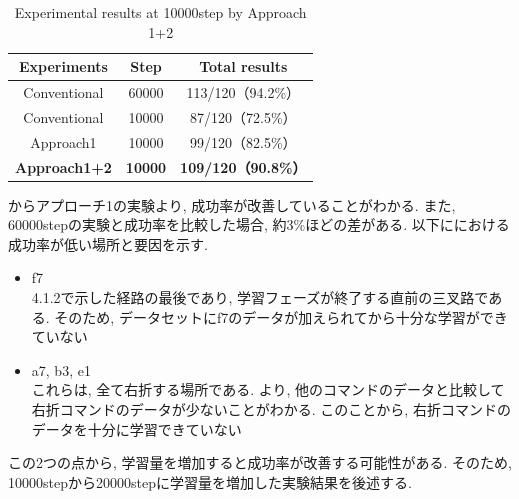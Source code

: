 \begin{itemize}

  \begin{table}[hbtp]
    \caption{Experimental results at 10000step by Approach 1+2}
    \label{table:result4}
    \centering
    \begin{tabular}{|c|c|c|}
      \hline
      Experiments & Step & Total results\\
      \hline
      Conventional & 60000 & 113/120（94.2\%）\\
      \hline
      Conventional & 10000 & 87/120（72.5\%）\\
      \hline
      Approach1 & 10000 & 99/120（82.5\%）\\
      \hline
      \textbf{Approach1+2} & \textbf{10000} & \textbf{109/120（90.8\%）}\\
      \hline
    \end{tabular}
  \end{table}


  からアプローチ1の実験より, 成功率が改善していることがわかる. また, 60000stepの実験と成功率を比較した場合, 約3\%ほどの差がある. 
  以下ににおける成功率が低い場所と要因を示す.
  \begin{itemize}
    \item f7\\
    4.1.2で示した経路の最後であり, 学習フェーズが終了する直前の三叉路である. そのため, データセットにf7のデータが加えられてから十分な学習ができていない
    \item a7, b3, e1\\
    これらは, 全て右折する場所である. より, 他のコマンドのデータと比較して右折コマンドのデータが少ないことがわかる. このことから, 右折コマンドのデータを十分に学習できていない
  \end{itemize} 

  この2つの点から, 学習量を増加すると成功率が改善する可能性がある. そのため, 10000stepから20000stepに学習量を増加した実験結果を後述する.

  \newpage



\end{itemize}
